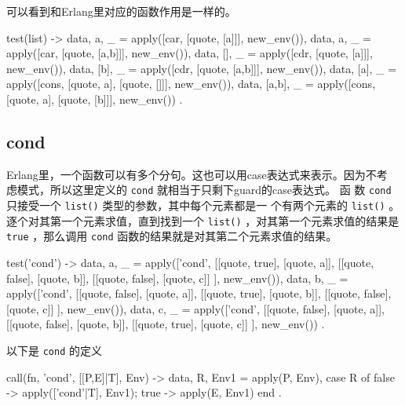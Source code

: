 \documentclass[preview,multi,crop=false,border=1in,class=memoir]{standalone}
\begin{document}
\begin{preview-page}
可以看到和Erlang里对应的函数作用是一样的。

\begin{SourceCode}
test(list) ->
    {{data, a}, _} =
        apply([car, [quote, [a]]], new_env()),
    {{data, a}, _} =
        apply([car, [quote, [a,b]]], new_env()),
    {{data, []}, _} =
        apply([cdr, [quote, [a]]], new_env()),
    {{data, [b]}, _} =
        apply([cdr, [quote, [a,b]]], new_env()),
    {{data, [a]}, _} =
        apply([cons, [quote, a], [quote, []]],
              new_env()),
    {{data, [a,b]}, _} =
        apply([cons, [quote, a], [quote, [b]]],
              new_env())
.
\end{SourceCode}

\subsection{cond}

Erlang里，一个函数可以有多个分句。这也可以用case表达式来表示。因为不考
虑模式，所以这里定义的 \verb|cond| 就相当于只剩下guard的case表达式。 函
数 \verb|cond| 只接受一个 \verb|list()| 类型的参数，其中每个元素都是一
个有两个元素的 \verb|list()| 。逐个对其第一个元素求值，直到找到一个
\verb|list()| ，对其第一个元素求值的结果是 \verb|true| ，那么调用
\verb|cond| 函数的结果就是对其第二个元素求值的结果。


\begin{SourceCode}
test('cond') ->
    {{data, a}, _} =
        apply(['cond',
               [[quote, true],  [quote, a]],
               [[quote, false], [quote, b]],
               [[quote, false], [quote, c]]
              ], new_env()),
    {{data, b}, _} =
        apply(['cond',
               [[quote, false], [quote, a]],
               [[quote, true],  [quote, b]],
               [[quote, false], [quote, c]]
              ], new_env()),
    {{data, c}, _} =
        apply(['cond',
               [[quote, false], [quote, a]],
               [[quote, false], [quote, b]],
               [[quote, true],  [quote, c]]
              ], new_env())
.
\end{SourceCode}

以下是 \verb|cond| 的定义

\begin{SourceCode}
call({fn, 'cond'}, [[P,E]|T], Env) ->
    {{data, R}, Env1} = apply(P, Env),
    case R of
        false ->
            apply(['cond'|T], Env1);
        true ->
            apply(E, Env1)
    end
.
\end{SourceCode}


\end{preview-page}
\end{document}
